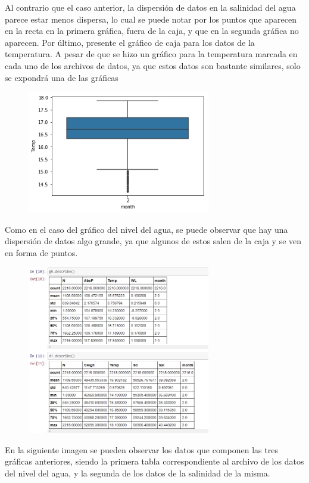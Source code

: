 \documentclass{article}
\begin{document}
Al contrario que el caso anterior, la dispersión de datos en la salinidad del agua parece estar menos dispersa, lo cual se puede notar por los puntos que aparecen en la recta en la primera gráfica, fuera de la caja, y que en la segunda gráfica no aparecen. 
Por último, presente el gráfico de caja para los datos de la temperatura. A pesar de que se hizo un gráfico para la temperatura marcada en cada uno de los archivos de datos, ya que estos datos son bastante similares, solo se expondrá una de las gráficas
\begin{figure}[htb]
    \begin{center}
    \includegraphics[width=8cm]{BPTemperatura.png}
    \end{center}
\end{figure}    
Como en el caso del gráfico del nivel del agua, se puede observar que hay una dispersión de datos algo grande, ya que algunos de estos salen de la caja y se ven en forma de puntos. 

\begin{figure}[htb]
    \begin{center}
    \includegraphics[width=8cm]{Describe.PNG}
    \end{center}
\end{figure}    

En la siguiente imagen se pueden observar los datos que componen las tres gráficas anteriores, siendo la primera tabla correspondiente al archivo de los datos del nivel del agua, y la segunda de los datos de la salinidad de la misma. 
\end{document}
